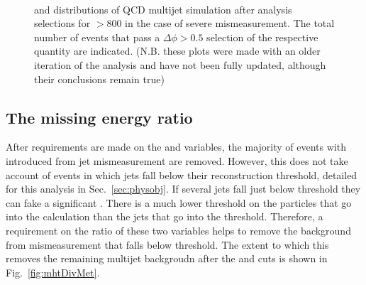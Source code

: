 \begin{figure}[!h]
 \centering
  \\
 \caption{\bdphi and \dphimhtj distributions of QCD multijet simulation
 after analysis selections for \scalht $> 800$ \GeV in the case of
 severe mismeasurement. The
 total number of events that pass a $\Delta\phi > 0.5$ selection of the
 respective quantity are indicated. (N.B. these plots were made with
 an older iteration of the analysis and have not been fully updated,
 although their conclusions remain true)}
 \label{fig:bDPhi_mismeasured}
\end{figure}

\subsection{The missing energy ratio \mhtmet}
\label{sec:mhtmet}

After requirements are made on the \alphat and \bdphi variables, the
majority of events with \MHT introduced from jet mismeasurement are
removed. However, this does not take account of events in which jets
fall below their reconstruction threshold, detailed for this analysis
in Sec.~\ref{sec:physobj}. If several jets fall just below threshold
they can fake a significant \MHT. There is a much lower threshold
on the particles that go into the \MET calculation than the jets that
go into the \MHT threshold. Therefore, a requirement on the ratio of
these two variables helps to remove the background from mismeasurement
that falls below threshold. The extent to which this removes the
remaining \QCD multijet backgroudn after the \alphat and \bdphi cuts
is shown in Fig.~\ref{fig:mhtDivMet}.

